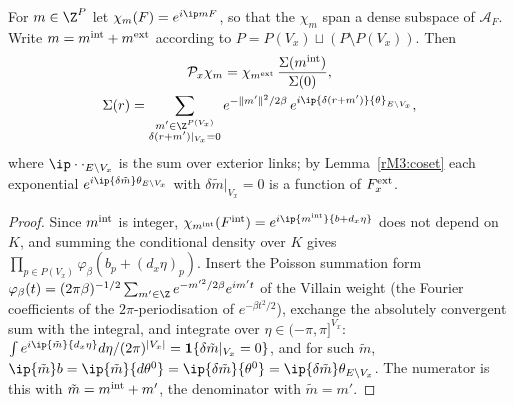 \begin{proposition}
\label{rM3:characters}
For $m\in\Z^P$ let $\chi_m(F)=e^{i\ip mF}$, so that the $\chi_m$ span a dense
subspace of $\mathcal A_F$. Write $m=m^{\rm int}+m^{\rm ext}$ according to
$P=P(V_x)\sqcup(P\setminus P(V_x))$. Then
\begin{gather*}
\mathcal P_x\chi_m=\chi_{m^{\rm ext}}\,\frac{\Sigma(m^{\rm int})}
{\Sigma(0)},\\
\Sigma(r)=\sum_{\substack{m'\in\Z^{P(V_x)}\\ \delta(r+m')|_{V_x}=0}}
e^{-\lVert m'\rVert^2/2\beta}\,e^{i\ip{\delta(r+m')}{\theta}_{E\setminus V_x}},
\end{gather*}
where $\ip\cdot\cdot_{E\setminus V_x}$ is the sum over exterior links; by
Lemma~\ref{rM3:coset} each exponential $e^{i\ip{\delta\tilde m}\theta_{E
\setminus V_x}}$ with $\delta\tilde m|_{V_x}=0$ is a function of $F^{\rm
ext}_x$.
\end{proposition}

\begin{proof}
Since $m^{\rm int}$ is integer, $\chi_{m^{\rm int}}(F^{\rm int})=e^{i\ip
{m^{\rm int}}{b+d_x\eta}}$ does not depend on $K$, and summing the
conditional density over $K$ gives $\prod_{p\in P(V_x)}\varphi_\beta(b_p+(d_x
\eta)_p)$. Insert the Poisson summation form $\varphi_\beta(t)=(2\pi
\beta)^{-1/2}\sum_{m'\in\Z}e^{-m'^2/2\beta}e^{im't}$ of the Villain
weight (the Fourier coefficients of the $2\pi$-periodisation of $e^{-\beta
t^2/2}$), exchange the absolutely convergent sum with the integral, and
integrate over $\eta\in(-\pi,\pi]^{V_x}$: $\int e^{i\ip{\tilde m}{d_x\eta}}
d\eta/(2\pi)^{\lvert V_x\rvert}=\mathbf 1\{\delta\tilde m|_{V_x}=0\}$, and for
such $\tilde m$, $\ip{\tilde m}b=\ip{\tilde m}{d\theta^0}=\ip{\delta\tilde m}
{\theta^0}=\ip{\delta\tilde m}\theta_{E\setminus V_x}$. The numerator is this
with $\tilde m=m^{\rm int}+m'$, the denominator with $\tilde m=m'$.
\end{proof}

